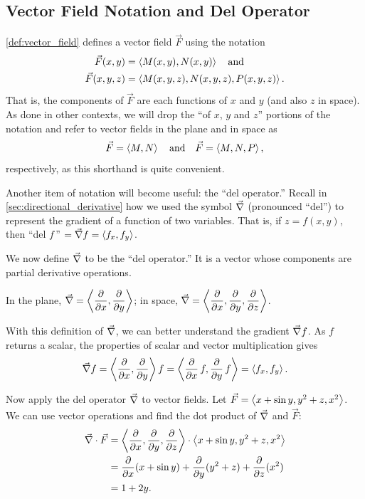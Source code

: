 \subsection{Vector Field Notation and Del Operator}

\autoref{def:vector_field} defines a vector field $\vec F$ using the notation
\begin{align*}
\vec F(x,y) &=\bracket{M(x,y), N(x,y)}
\quad \text{and}\\%
\vec F(x,y,z) &=\bracket{M(x,y,z), N(x,y,z),P(x,y,z)}.
\end{align*}
That is, the components of $\vec F$ are each functions of $x$ and $y$ (and also $z$ in space). As done in other contexts, we will drop the ``of $x$, $y$ and $z$'' portions of the notation and refer to vector fields in the plane and in space as 
\[\vec F =\left\langle M, N\right\rangle\quad \text{and} \quad \vec F  =\left\langle M,N,P\right\rangle,\]
respectively, as this shorthand is quite convenient.

Another item of notation will become useful: the ``del operator.'' Recall in \autoref{sec:directional_derivative} how we used the symbol $\vec\nabla$ (pronounced ``del'') to represent the gradient of a function of two variables. That is, if $z = f(x,y)$, then ``del $f$\,'' $= \vec\nabla f =\left\langle f_x, f_y\right\rangle$. 

We now define $\vec\nabla$ to be the ``del operator.'' It is a vector whose components are partial derivative operations. 

In the plane, $\displaystyle\vec\nabla =\left\langle \frac{\partial}{\partial x}, \frac{\partial}{\partial y}\right\rangle$; in space, $\displaystyle\vec\nabla =\left\langle \frac{\partial}{\partial x}, \frac{\partial}{\partial y},\frac{\partial}{\partial z}\right\rangle$. 

With this definition of $\vec\nabla$, we can better understand the gradient $\vec\nabla f$. As $f$ returns a scalar, the properties of scalar and vector multiplication gives
\[
\vec\nabla f
=\left\langle \frac{\partial}{\partial x}, \frac{\partial}{\partial y}\right\rangle f
=\left\langle \frac{\partial}{\partial x}\,f, \frac{\partial}{\partial y}\,f\right\rangle
=\left\langle f_x, f_y\right\rangle.
\]

Now apply the del operator $\vec\nabla$ to vector fields. Let $\vec F =\left\langle x+\sin y,y^2+z,x^2\right\rangle$. We can use vector operations and find the dot product of $\vec\nabla$ and $\vec F$:
\begin{align*}
	\vec\nabla \cdot \vec F
	&=\left\langle \frac{\partial}{\partial x}, \frac{\partial}{\partial y},\frac{\partial}{\partial z}\right\rangle\cdot \left\langle x+\sin y,y^2+z,x^2\right\rangle\\
	&= \frac{\partial}{\partial x}(x+\sin y)+ \frac{\partial}{\partial y}(y^2+z) + \frac{\partial}{\partial z}(x^2) \\
	&=1+2y.
\end{align*}

